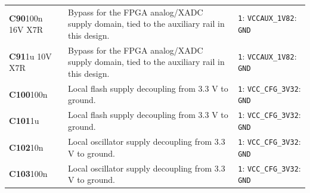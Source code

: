 \documentclass[11pt,a4paper]{article}
\begin{document}
\begin{longtable}{@{}P{27mm}P{84mm}P{57mm}@{}}
\textbf{C90}\newline 100n 16V X7R & Bypass for the FPGA analog/XADC supply domain, tied to the auxiliary rail in this design. & \nolinkurl{1}: \nolinkurl{VCCAUX_1V8}\newline \nolinkurl{2}: \nolinkurl{GND} \\
\textbf{C91}\newline 1u 10V X7R & Bypass for the FPGA analog/XADC supply domain, tied to the auxiliary rail in this design. & \nolinkurl{1}: \nolinkurl{VCCAUX_1V8}\newline \nolinkurl{2}: \nolinkurl{GND} \\
\textbf{C100}\newline 100n & Local flash supply decoupling from 3.3 V to ground. & \nolinkurl{1}: \nolinkurl{VCC_CFG_3V3}\newline \nolinkurl{2}: \nolinkurl{GND} \\
\textbf{C101}\newline 1u & Local flash supply decoupling from 3.3 V to ground. & \nolinkurl{1}: \nolinkurl{VCC_CFG_3V3}\newline \nolinkurl{2}: \nolinkurl{GND} \\
\textbf{C102}\newline 10n & Local oscillator supply decoupling from 3.3 V to ground. & \nolinkurl{1}: \nolinkurl{VCC_CFG_3V3}\newline \nolinkurl{2}: \nolinkurl{GND} \\
\textbf{C103}\newline 100n & Local oscillator supply decoupling from 3.3 V to ground. & \nolinkurl{1}: \nolinkurl{VCC_CFG_3V3}\newline \nolinkurl{2}: \nolinkurl{GND} \\

\end{longtable}
\end{document}
